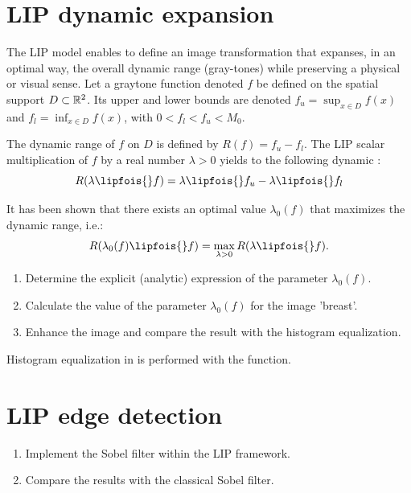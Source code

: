 \vspace*{-12pt}

\section{LIP dynamic expansion}
The LIP model enables to define an image transformation that expanses, in an optimal way, the overall dynamic range (gray-tones) while preserving a physical or visual sense.
Let a graytone function denoted $f$ be defined on the spatial support $D\subset\mathbb{R}^2$. Its upper and lower bounds are denoted $\displaystyle f_u=\sup_{x\in D} f(x)$ and $\displaystyle f_l=\inf_{x\in D} f(x)$, with $0<f_l<f_u<M_0$.

The dynamic range of $f$ on $D$ is defined by $R(f)= f_u-f_l$. The LIP scalar multiplication of $f$ by a real number $\lambda>0$ yields to the following dynamic : \begin{equation}
R(\lambda\lipfois{}f) = \lambda\lipfois{}f_u - \lambda\lipfois{}f_l
\end{equation}


It has been shown \cite{Jourlin1995} that there exists an optimal value $\lambda_0(f)$ that maximizes the dynamic range, i.e.: 
\begin{equation}
R(\lambda_0(f)\lipfois{}f)=\max_{\lambda>0}R(\lambda\lipfois{}f).
\end{equation}

\begin{qbox}
\begin{enumerate}
	\item Determine the explicit (analytic) expression of the parameter $\lambda_0(f)$.
	\item Calculate the value of the parameter $\lambda_0(f)$ for the image 'breast'.
	\item Enhance the image and compare the result with the histogram equalization.
\end{enumerate}
\end{qbox}

\begin{mcomment}
\begin{mremark}
Histogram equalization in \matlabregistered{} is performed with the  function.
\end{mremark}
\end{mcomment}

\begin{pcomment}
\begin{premark}
\end{premark}
\end{pcomment}

\vspace*{-12pt}

\section{LIP edge detection}
\begin{qbox}
\begin{enumerate}
	\item Implement the Sobel filter within the LIP framework.
	\item Compare the results with the classical Sobel filter.
\end{enumerate}
\end{qbox}
